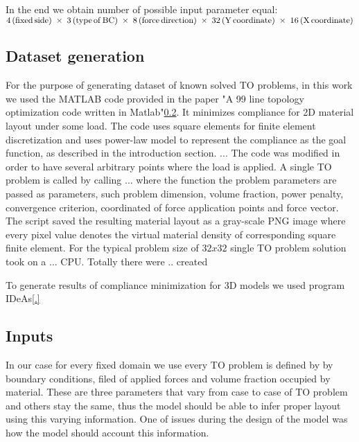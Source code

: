 In the end we obtain number of possible input parameter equal: $4\,\mathrm{(fixed \, side)} \; \times \; 3\,\mathrm{(type \, of \, BC)} \\ \; \times \; 8\,\mathrm{(force \, direction)} \; \times \; 32\,\mathrm{(Y \, coordinate)} \; \times \; 16\,\mathrm{(X \, coordinate)}$


\subsection{Dataset generation}

For the purpose of generating dataset of known solved TO problems, in this work we used the MATLAB code provided in the paper "A 99 line topology optimization code written in Matlab"\ref{}.
It minimizes compliance for 2D material layout under some load.
The code uses square elements for finite element discretization and uses power-law model to represent the compliance as the goal function, as described in the introduction section.
...
The code was modified in order to have several arbitrary points where the load is applied.
A single TO problem is called by calling ... where the function the problem parameters are passed as parameters, such problem dimension, volume fraction, power penalty, convergence criterion, coordinated of force application points and force vector. 
The script saved the resulting material layout as a gray-scale PNG image where every pixel value denotes the virtual material density of corresponding square finite element.
For the typical problem size of $ 32 x 32 $ single TO problem solution took on a ... CPU.
Totally there were .. created
\medskip

To generate results of compliance minimization for 3D models we used program IDeAs\ref{.} 




\subsection{Inputs}

In our case for every fixed domain we use every TO problem is defined by by boundary conditions, filed of applied forces and volume fraction occupied by material. 
These are three parameters that vary from case to case of TO problem and others stay the same, thus the model should be able to infer proper layout using this varying information.
One of issues during the design of the model was how the model should account this information.
\medskip


